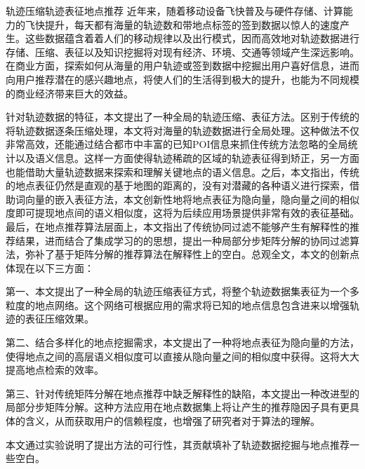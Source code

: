 
\begin{Cabstract}{轨迹压缩}{轨迹表征}{地点推荐}{}{}
近年来，随着移动设备飞快普及与硬件存储、计算能力的飞快提升，每天都有海量的轨迹数和带地点标签的签到数据以惊人的速度产生。这些数据蕴含着着人们的移动规律以及出行模式，因而高效地对轨迹数据进行存储、压缩、表征以及知识挖掘将对现有经济、环境、交通等领域产生深远影响。在商业方面，探索如何从海量的用户轨迹或签到数据中挖掘出用户喜好信息，进而向用户推荐潜在的感兴趣地点，将使人们的生活得到极大的提升，也能为不同规模的商业经济带来巨大的效益。

针对轨迹数据的特征，本文提出了一种全局的轨迹压缩、表征方法。区别于传统的将轨迹数据逐条压缩处理，本文将对海量的轨迹数据进行全局处理。这种做法不仅非常高效，还能通过结合都市中丰富的已知POI信息来抓住传统方法忽略的全局统计以及语义信息。这样一方面使得轨迹稀疏的区域的轨迹表征得到矫正，另一方面也能借助大量轨迹数据来探索和理解关键地点的语义信息。之后，本文指出，传统的地点表征仍然是直观的基于地图的距离的，没有对潜藏的各种语义进行探索，借助词向量的嵌入表征方法，本文创新性地将地点表征为隐向量，隐向量之间的相似度即可提现地点间的语义相似度，这将为后续应用场景提供非常有效的表征基础。最后，在地点推荐算法层面上，本文指出了传统协同过滤不能够产生有解释性的推荐结果，进而结合了集成学习的的思想，提出一种局部分步矩阵分解的协同过滤算法，弥补了基于矩阵分解的推荐算法在解释性上的空白。总观全文，本文的创新点体现在以下三方面：

第一、本文提出了一种全局的轨迹压缩表征方式，将整个轨迹数据集表征为一个多粒度的地点网络。这个网络可根据应用的需求将已知的地点信息包含进来以增强轨迹的表征压缩效果。

第二、结合多样化的地点挖掘需求，本文提出了一种将地点表征为隐向量的方法，使得地点之间的高层语义相似度可以直接从隐向量之间的相似度中获得。这将大大提高地点检索的效率。

第三、针对传统矩阵分解在地点推荐中缺乏解释性的缺陷，本文提出一种改进型的局部分步矩阵分解。这种方法应用在地点数据集上将让产生的推荐隐因子具有更具体的含义，从而获取用户的信赖程度，也增强了研究者对于算法的理解。

本文通过实验说明了提出方法的可行性，其贡献填补了轨迹数据挖掘与地点推荐一些空白。
\end{Cabstract}

